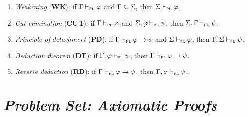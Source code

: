 \documentclass[a4paper, 11pt]{article} %
\begin{document}
\begin{enumerate}[itemsep=2pt]\small
	\item \textit{Weakening} (\textbf{WK}): if $\Gamma \vdash_{\textsc{pl}} \varphi$ and $\Gamma \subseteq \Sigma$, then $\Sigma \vdash_{\textsc{pl}} \varphi$.
  \item \textit{Cut elimination} (\textbf{CUT}): if $\Gamma \vdash_{\textsc{pl}} \varphi$ and $\Sigma, \varphi \vdash_{\textsc{pl}} \psi$, then $\Sigma,\Gamma \vdash_{\textsc{pl}} \psi$.
	\item \textit{Principle of detachment} (\textbf{PD}): if $\Gamma \vdash_{\textsc{pl}} \varphi \rightarrow \psi$ and $\Sigma \vdash_{\textsc{pl}} \varphi$, then $\Gamma, \Sigma \vdash_{\textsc{pl}} \psi$.
  \item \textit{Deduction theorem} (\textbf{DT}): if $\Gamma, \varphi \vdash_{\textsc{pl}} \psi$, then $\Gamma \vdash_{\textsc{pl}} \varphi \rightarrow \psi$.
	\item \textit{Reverse deduction} (\textbf{RD}): if $\Gamma \vdash_{\textsc{pl}} \varphi \rightarrow \psi$, then $\Gamma, \varphi \vdash_{\textsc{pl}} \psi$.
\end{enumerate}



\section*{\it Problem Set: Axiomatic Proofs}
\end{document}
